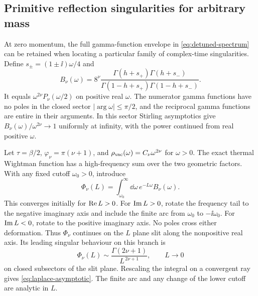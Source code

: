 \subsection{Primitive reflection singularities for arbitrary mass}
\label{sec:primitive-time}

At zero momentum, the full gamma-function envelope in
\eqref{eq:detuned-spectrum} can be
retained when locating a particular family of complex-time singularities.
Define \(s_\pm=(1\pm\ii)\omega/4\) and
\begin{equation}
 B_\nu(\omega)=8^\nu
 \frac{\Gamma(h+s_+)\Gamma(h+s_-)}
      {\Gamma(1-h+s_+)\Gamma(1-h+s_-)} .
 \label{eq:analytic-envelope}
\end{equation}
It equals \(\omega^{2\nu}P_\nu(\omega/2)\) on positive real \(\omega\).
The numerator gamma functions have no poles in the closed sector
\(|\arg\omega|\leq\pi/2\), and the reciprocal gamma functions are entire
in their arguments. In this sector Stirling asymptotics give
\(B_\nu(\omega)/\omega^{2\nu}\to1\) uniformly at infinity, with the
power continued from real positive \(\omega\).

Let \(\tau=\beta/2\), \(\varphi_\nu=\pi(\nu+1)\), and
\(\rho_{\rm vac}(\omega)=C_\nu\omega^{2\nu}\) for \(\omega>0\).
The exact thermal Wightman function has a high-frequency sum over
the two geometric factors. With any fixed cutoff \(\omega_0>0\),
introduce
\begin{equation}
 \Phi_\nu(L)=\int_{\omega_0}^\infty
      \dd\omega\, e^{-L\omega}B_\nu(\omega).
\end{equation}
This converges initially for \({\rm Re}\,L>0\). For
\({\rm Im}\,L>0\), rotate the frequency tail to the negative
imaginary axis and include the finite arc from \(\omega_0\) to
\(-\ii\omega_0\). For \({\rm Im}\,L<0\), rotate to the positive
imaginary axis. No poles cross either deformation. Thus
\(\Phi_\nu\) continues on the \(L\) plane slit along the nonpositive
real axis. Its leading singular behaviour on this branch is
\begin{equation}
 \Phi_\nu(L)\sim\frac{\Gamma(2\nu+1)}{L^{\,2\nu+1}},
 \qquad L\longrightarrow0
 \label{eq:laplace-asymptotic}
\end{equation}
on closed subsectors of the slit plane. Rescaling the integral
on a convergent ray gives \eqref{eq:laplace-asymptotic}. The finite
arc and any change of the lower cutoff are analytic in \(L\).

